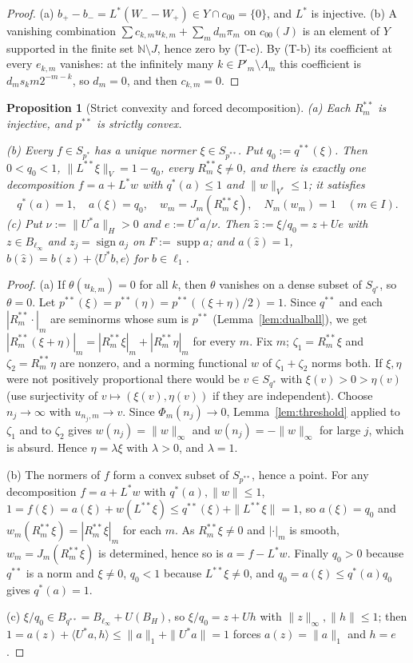 \documentclass[10pt]{amsart}
\newtheorem{proposition}[theorem]{Proposition}
\theoremstyle{definition}
\theoremstyle{remark}
\newcommand{\supp}{\operatorname{supp}}
\newcommand{\sgn}{\operatorname{sign}}
\newcommand{\N}{\mathbb N}
\newcommand{\zh}{\hat z}
\newcommand{\ip}[2]{\langle #1,#2\rangle}
\begin{document}
\begin{proof}
(a) $b_+-b_-=L^*(W_--W_+)\in Y\cap c_{00}=\{0\}$, and $L^*$ is injective.
(b) A vanishing combination
$\sum c_{k,m}u_{k,m}+\sum_md_m\pi_m$ on $c_{00}(J)$ is an element of $Y$
supported in the finite set $\N\setminus J$, hence zero by (T-c).  By
(T-b) its coefficient at every $e_{k,m}$ vanishes: at the infinitely many
$k\in P'_m\setminus\Lambda_m$ this coefficient is $d_ms_km2^{-m-k}$, so
$d_m=0$, and then $c_{k,m}=0$.
\end{proof}

\begin{proposition}[Strict convexity and forced decomposition]\label{prop:forced}
\textup{(a)} Each $R_m^{**}$ is injective, and $p^{**}$ is strictly convex.

\textup{(b)} Every $f\in S_{p^*}$ has a unique normer $\xi\in S_{p^{**}}$.
Put $q_0:=q^{**}(\xi)$.  Then $0<q_0<1$, $\|L^{**}\xi\|_V=1-q_0$, every
$R_m^{**}\xi\ne0$, and there is exactly one decomposition $f=a+L^*w$ with
$q^*(a)\le1$ and $\|w\|_{V^*}\le1$; it satisfies
\[
 q^*(a)=1,\quad a(\xi)=q_0,\quad w_m=J_m(R_m^{**}\xi),\quad N_m(w_m)=1
 \quad(m\in I).
\]
\textup{(c)} Put $\nu:=\|U^*a\|_H>0$ and $e:=U^*a/\nu$.  Then
$\zh:=\xi/q_0=z+Ue$ with $z\in B_{\ell_\infty}$ and $z_j=\sgn a_j$ on
$F:=\supp a$; and $a(\zh)=1$, $b(\zh)=b(z)+\ip{U^*b}{e}$ for
$b\in\ell_1$.
\end{proposition}

\begin{proof}
(a) If $\theta(u_{k,m})=0$ for all $k$, then $\theta$ vanishes on a dense
subset of $S_{q^*}$, so $\theta=0$.  Let
$p^{**}(\xi)=p^{**}(\eta)=p^{**}((\xi+\eta)/2)=1$.  Since $q^{**}$ and each
$|R_m^{**}\cdot|_m$ are seminorms whose sum is $p^{**}$
(Lemma~\ref{lem:dualball}), we get
$|R_m^{**}(\xi+\eta)|_m=|R_m^{**}\xi|_m+|R_m^{**}\eta|_m$ for every $m$.
Fix $m$; $\zeta_1=R_m^{**}\xi$ and $\zeta_2=R_m^{**}\eta$ are nonzero, and a
norming functional $w$ of $\zeta_1+\zeta_2$ norms both.  If $\xi,\eta$ were
not positively proportional there would be $v\in S_{q^*}$ with
$\xi(v)>0>\eta(v)$ (use surjectivity of $v\mapsto(\xi(v),\eta(v))$ if they
are independent).  Choose $n_j\to\infty$ with $u_{n_j,m}\to v$.  Since
$\Phi_m(n_j)\to0$, Lemma~\ref{lem:threshold} applied to $\zeta_1$ and to
$\zeta_2$ gives $w(n_j)=\|w\|_\infty$ and $w(n_j)=-\|w\|_\infty$ for large
$j$, which is absurd.  Hence $\eta=\lambda\xi$ with $\lambda>0$, and
$\lambda=1$.

(b) The normers of $f$ form a convex subset of $S_{p^{**}}$, hence a point.
For any decomposition $f=a+L^*w$ with $q^*(a),\|w\|\le1$,
$1=f(\xi)=a(\xi)+w(L^{**}\xi)\le q^{**}(\xi)+\|L^{**}\xi\|=1$, so
$a(\xi)=q_0$ and $w_m(R_m^{**}\xi)=|R_m^{**}\xi|_m$ for each $m$.  As
$R_m^{**}\xi\ne0$ and $|\cdot|_m$ is smooth, $w_m=J_m(R_m^{**}\xi)$ is
determined, hence so is $a=f-L^*w$.  Finally $q_0>0$ because $q^{**}$ is a norm and
$\xi\ne0$, $q_0<1$ because $L^{**}\xi\ne0$, and
$q_0=a(\xi)\le q^*(a)q_0$ gives $q^*(a)=1$.

(c) $\xi/q_0\in B_{q^{**}}=B_{\ell_\infty}+U(B_H)$, so $\xi/q_0=z+Uh$ with
$\|z\|_\infty,\|h\|\le1$; then $1=a(z)+\ip{U^*a}{h}\le\|a\|_1+\|U^*a\|=1$
forces $a(z)=\|a\|_1$ and $h=e$.
\end{proof}
\end{document}
